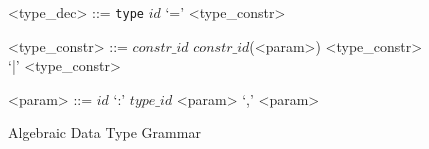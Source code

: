 \begin{figure}[!h]
\begin{grammar}
<type_dec> ::= \verb|type| $id$ `=' <type_constr>

<type_constr> ::= $constr\_id$
\alt $constr\_id$(<param>)
\alt <type_constr> `|' <type_constr>

<param> ::= $id$ `:' $type\_id$
\alt <param> `,' <param>

\end{grammar}
\hrulefill
\caption{Algebraic Data Type Grammar}
\label{ADT}
\end{figure}
